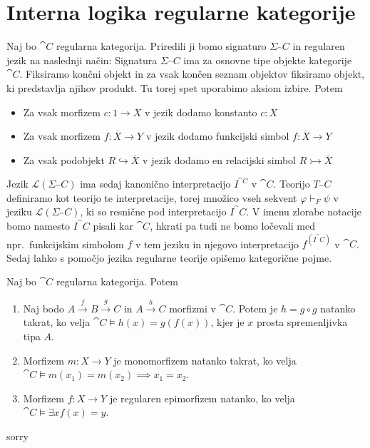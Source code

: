 \documentclass[../kategoricna_logika.tex]{subfiles}
\begin{document}
\section{Interna logika regularne kategorije}
Naj bo $\cat{C}$ regularna kategorija.
Priredili ji bomo signaturo $\Sigma_\cat{C}$ in regularen jezik na naslednji način:
Signatura $\Sigma_\cat{C}$ ima za osnovne tipe objekte kategorije $\cat{C}$.
Fiksiramo končni objekt in za vsak končen seznam objektov fiksiramo objekt, ki predstavlja njihov produkt.
Tu torej spet uporabimo aksiom izbire. Potem
\begin{itemize}
  \item Za vsak morfizem $c : 1 \to X$ v jezik dodamo konstanto $c:X$
  \item Za vsak morfizem $f : \overline{X} \to Y$ v jezik dodamo funkcijski simbol $f : \overline{X} \to Y$
  \item Za vsak podobjekt $R \hookrightarrow \overline{X}$ v jezik dodamo en relacijski simbol $R \rightarrowtail \overline{X}$
\end{itemize}
Jezik $\mathcal{L}(\Sigma_\cat{C})$ ima sedaj kanonično interpretacijo $I^{\cat{C}}$ v $\cat{C}$.
Teorijo $T_\cat{C}$ definiramo kot teorijo te interpretacije, torej množico vseh sekvent
$\varphi \vdash_F \psi$ v jeziku $\mathcal{L}(\Sigma_\cat{C})$, ki so resnične pod interpretacijo $I^\cat{C}$.
V imenu zlorabe notacije bomo namesto $I^\cat{C}$ pisali kar $\cat{C}$, 
hkrati pa tudi ne bomo ločevali med npr.\ funkcijskim simbolom $f$ v tem jeziku in njegovo interpretacijo $f^{(I^\cat{C})}$ v $\cat{C}$.
Sedaj lahko s pomočjo jezika regularne teorije opišemo kategorične pojme.
\begin{lema}
  Naj bo $\cat{C}$ regularna kategorija. Potem
  \begin{enumerate}[label=(\roman*)]
    \item Naj bodo $A \xrightarrow{f} B \xrightarrow{g} C$ in $A \xrightarrow{h} C$ morfizmi v $\cat{C}$.
    Potem je $h = g \circ g$ natanko takrat, ko velja $\cat{C} \models h(x) = g(f(x))$, kjer je $x$ prosta spremenljivka tipa $A$.
    \item Morfizem $m : X \to Y$ je monomorfizem natanko takrat, ko velja $\cat{C} \models m(x_1) = m(x_2) \implies x_1 = x_2$.
    \item Morfizem $f : X \to Y$ je regularen epimorfizem natanko, ko velja $\cat{C} \models \exists x f(x) = y$.
  \end{enumerate}
\end{lema}
\begin{dokaz}
  sorry
\end{dokaz}
\end{document}

